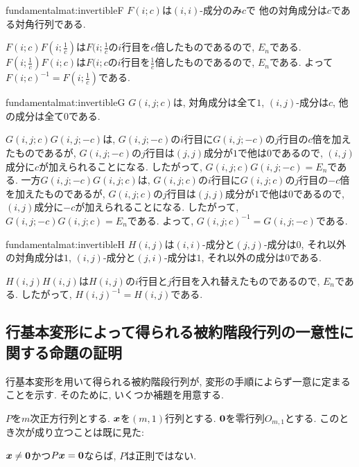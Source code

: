 \begin{proofof*}{fundamentalmat:invertible}{F}
  $F(i;c)$は$(i,i)$-成分のみ$c$で
  他の対角成分は$c$である対角行列である.

  $F(i;c)F(i;\frac{1}{c})$は$F(i;\frac{1}{c}$の$i$行目を$c$倍したものであるので,
  $E_n$である.
  $F(i;\frac{1}{c})F(i;c)$は$F(i;c$の$i$行目を$\frac{1}{c}$倍したものであるので,
  $E_n$である.
  よって$F(i;c)^{-1}=F(i;\frac{1}{c})$である.
\end{proofof*}
\begin{proofof*}{fundamentalmat:invertible}{G}
  $G(i,j;c)$は, 対角成分は全て$1$, $(i,j)$-成分は$c$, 他の成分は全て$0$である.

  $G(i,j;c)G(i,j;-c)$は, $G(i,j;-c)$の$i$行目に$G(i,j;-c)$の$j$行目の$c$倍を加えたものであるが, $G(i,j;-c)$の$j$行目は$(j,j)$成分が$1$で他は$0$であるので,
  $(i,j)$成分に$c$が加えられることになる.
  したがって, $G(i,j;c)G(i,j;-c)=E_n$である.
  一方$G(i,j;-c)G(i,j;c)$は, $G(i,j;c)$の$i$行目に$G(i,j;c)$の$j$行目の$-c$倍を加えたものであるが, $G(i,j;c)$の$j$行目は$(j,j)$成分が$1$で他は$0$であるので,
  $(i,j)$成分に$-c$が加えられることになる.
  したがって, $G(i,j;-c)G(i,j;c)=E_n$である.
  よって, $G(i,j;c)^{-1}=G(i,j;-c)$である.
\end{proofof*}
\begin{proofof*}{fundamentalmat:invertible}{H}
  $H(i,j)$は$(i,i)$-成分と$(j,j)$-成分は$0$, それ以外の対角成分は$1$,
  $(i,j)$-成分と$(j,i)$-成分は$1$, それ以外の成分は$0$である.

  $H(i,j)H(i,j)$は$H(i,j)$の$i$行目と$j$行目を入れ替えたものであるので,
  $E_n$である.
  したがって, $H(i,j)^{-1}=H(i,j)$である.
\end{proofof*}



\subsection{行基本変形によって得られる被約階段行列の一意性に関する命題の証明}
行基本変形を用いて得られる被約階段行列が,
変形の手順によらず一意に定まることを示す.
そのために, いくつか補題を用意する.


$P$を$m$次正方行列とする.
$\boldsymbol{x}$を$(m,1)$行列とする.
$\boldsymbol{0}$を零行列$O_{m,1}$とする.
このとき次が成り立つことは既に見た:
\begin{lemma}
  \label{lem:1}
  $\boldsymbol{x}\neq\boldsymbol{0}$かつ$P\boldsymbol{x}=\boldsymbol{0}$ならば,
  $P$は正則ではない.
\end{lemma}



